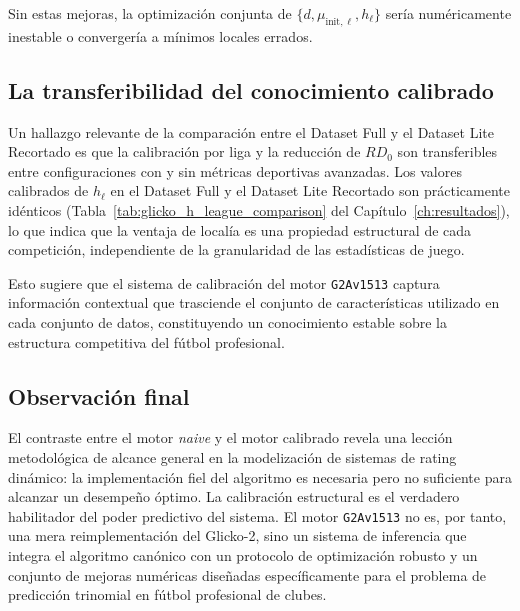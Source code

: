 Sin estas mejoras, la optimizaci\'on conjunta de $\{d, \mu_{\text{init},\ell}, h_\ell\}$ ser\'ia num\'ericamente inestable o converger\'ia a m\'inimos locales errados.

\subsection{La transferibilidad del conocimiento calibrado}

Un hallazgo relevante de la comparaci\'on entre el Dataset Full y el Dataset Lite Recortado es que la calibraci\'on por liga y la reducci\'on de $RD_0$ son transferibles entre configuraciones con y sin m\'etricas deportivas avanzadas. Los valores calibrados de $h_\ell$ en el Dataset Full y el Dataset Lite Recortado son pr\'acticamente id\'enticos (Tabla~\ref{tab:glicko_h_league_comparison} del Cap\'itulo~\ref{ch:resultados}), lo que indica que la ventaja de local\'ia es una propiedad estructural de cada competici\'on, independiente de la granularidad de las estad\'isticas de juego.

Esto sugiere que el sistema de calibraci\'on del motor \texttt{G2Av1513} captura informaci\'on contextual que trasciende el conjunto de caracter\'isticas utilizado en cada conjunto de datos, constituyendo un conocimiento estable sobre la estructura competitiva del f\'utbol profesional.

\subsection*{Observaci\'on final}

El contraste entre el motor \textit{naive} y el motor calibrado revela una lecci\'on metodol\'ogica de alcance general en la modelizaci\'on de sistemas de rating din\'amico: la implementaci\'on fiel del algoritmo es necesaria pero no suficiente para alcanzar un desempe\~no \'optimo. La calibraci\'on estructural es el verdadero habilitador del poder predictivo del sistema. El motor \texttt{G2Av1513} no es, por tanto, una mera reimplementaci\'on del Glicko-2, sino un sistema de inferencia que integra el algoritmo can\'onico con un protocolo de optimizaci\'on robusto y un conjunto de mejoras num\'ericas dise\~nadas espec\'ificamente para el problema de predicci\'on trinomial en f\'utbol profesional de clubes.


